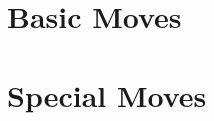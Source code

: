 \documentclass{article}
\begin{document}
\begin{multicols}{2}
  \section*{Basic Moves}
  
  \section*{Special Moves}
  
\end{multicols}
\end{document}
